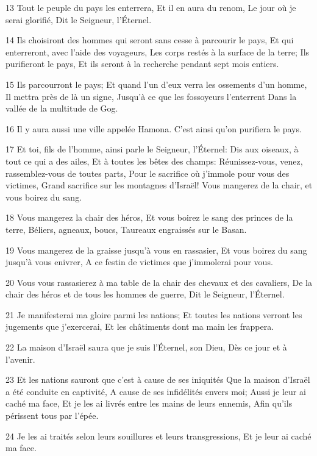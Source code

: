 \par 13 Tout le peuple du pays les enterrera, Et il en aura du renom, Le jour où je serai glorifié, Dit le Seigneur, l'Éternel.
\par 14 Ils choisiront des hommes qui seront sans cesse à parcourir le pays, Et qui enterreront, avec l'aide des voyageurs, Les corps restés à la surface de la terre; Ils purifieront le pays, Et ils seront à la recherche pendant sept mois entiers.
\par 15 Ils parcourront le pays; Et quand l'un d'eux verra les ossements d'un homme, Il mettra près de là un signe, Jusqu'à ce que les fossoyeurs l'enterrent Dans la vallée de la multitude de Gog.
\par 16 Il y aura aussi une ville appelée Hamona. C'est ainsi qu'on purifiera le pays.
\par 17 Et toi, fils de l'homme, ainsi parle le Seigneur, l'Éternel: Dis aux oiseaux, à tout ce qui a des ailes, Et à toutes les bêtes des champs: Réunissez-vous, venez, rassemblez-vous de toutes parts, Pour le sacrifice où j'immole pour vous des victimes, Grand sacrifice sur les montagnes d'Israël! Vous mangerez de la chair, et vous boirez du sang.
\par 18 Vous mangerez la chair des héros, Et vous boirez le sang des princes de la terre, Béliers, agneaux, boucs, Taureaux engraissés sur le Basan.
\par 19 Vous mangerez de la graisse jusqu'à vous en rassasier, Et vous boirez du sang jusqu'à vous enivrer, A ce festin de victimes que j'immolerai pour vous.
\par 20 Vous vous rassasierez à ma table de la chair des chevaux et des cavaliers, De la chair des héros et de tous les hommes de guerre, Dit le Seigneur, l'Éternel.
\par 21 Je manifesterai ma gloire parmi les nations; Et toutes les nations verront les jugements que j'exercerai, Et les châtiments dont ma main les frappera.
\par 22 La maison d'Israël saura que je suis l'Éternel, son Dieu, Dès ce jour et à l'avenir.
\par 23 Et les nations sauront que c'est à cause de ses iniquités Que la maison d'Israël a été conduite en captivité, A cause de ses infidélités envers moi; Aussi je leur ai caché ma face, Et je les ai livrés entre les mains de leurs ennemis, Afin qu'ils périssent tous par l'épée.
\par 24 Je les ai traités selon leurs souillures et leurs transgressions, Et je leur ai caché ma face.
